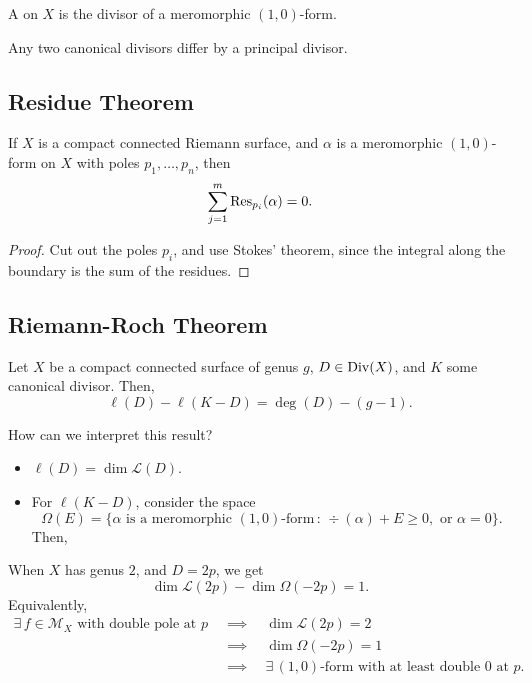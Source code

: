 \documentclass{lkx_paper}
\begin{document}
\begin{definition}
	A  on $X$ is the divisor of a meromorphic $(1,0)$-form.
\end{definition}

\begin{lemma}
	Any two canonical divisors differ by a principal divisor.
\end{lemma}

\subsection{Residue Theorem}

\begin{theorem}
	If $X$ is a compact connected Riemann surface, and $\alpha$ is a meromorphic $(1,0)$-form on $X$ with poles $p_1,\ldots, p_n$, then
	\[
		\sum^m_{j=1}\mathrm{Res}_{p_i}(\alpha)=0.
	\]
\end{theorem}

\begin{proof}
	Cut out the poles $p_i$, and use Stokes' theorem, since the integral along the boundary is the sum of the residues.
\end{proof}

\subsection{Riemann-Roch Theorem}

\begin{theorem}
	Let $X$ be a compact connected surface of genus $g$, $D\in \mathrm{Div}(X)$, and $K$ some canonical divisor. Then,
	\[
		\ell(D) - \ell(K-D) = \deg(D)-(g-1).
	\]
\end{theorem}

How can we interpret this result?
\begin{itemize}
	\item $\ell(D) = \dim\mathcal{L}(D)$.
	\item For $\ell(K-D)$, consider the space
	      \[
		      \Omega(E) = \{\alpha \textrm{ is a meromorphic }(1,0)\textrm{-form}\, :\,\div(\alpha) + E \geq 0, \textrm{ or } \alpha = 0\}.
	      \]
	      Then,
\end{itemize}

\begin{example}
	When $X$ has genus $2$, and $D=2p$, we get
	\[
		\dim \mathcal{L}(2p)-\dim\Omega(-2p) = 1.
	\]
	Equivalently,
	\[
		\begin{aligned}
			\exists\, f\in \mathcal{M}_X\textrm{ with double pole at }p
			\quad & \implies\quad \dim\mathcal{L}(2p)=2                                       \\
			\quad & \implies\quad \dim\Omega(-2p)=1                                           \\
			\quad & \implies \quad \exists\, (1,0)\textrm{-form with at least double 0 at }p.
		\end{aligned}
	\]
\end{example}
\end{document}
